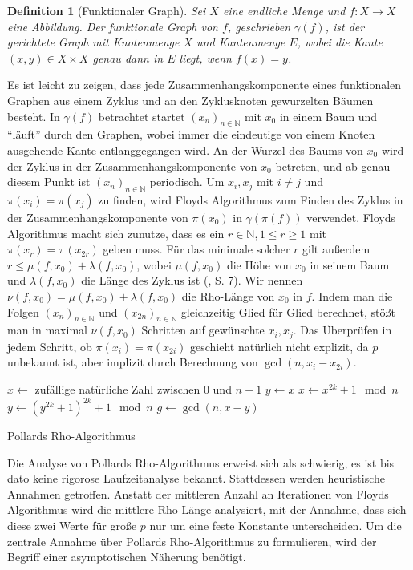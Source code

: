 \documentclass[a4paper, 10pt, ngerman]{article}
\newcommand{\N}{\mathbb{N}}
\newtheorem{definition}{Definition}
\begin{document}
\begin{definition}[Funktionaler Graph]
    Sei $X$ eine endliche Menge und $f: X \to X$ eine Abbildung. Der funktionale Graph von $f$, geschrieben $\gamma(f)$, ist der gerichtete Graph mit Knotenmenge $X$ und Kantenmenge $E$, wobei die Kante $(x, y) \in X \times X$ genau dann in $E$ liegt, wenn $f(x) = y$.
\end{definition}

\noindent Es ist leicht zu zeigen, dass jede Zusammenhangskomponente eines funktionalen Graphen aus einem Zyklus und an den Zyklusknoten gewurzelten Bäumen besteht. In $\gamma(f)$ betrachtet startet $(x_n)_{n \in \N}$ mit $x_0$ in einem Baum und "`läuft"' durch den Graphen, wobei immer die eindeutige von einem Knoten ausgehende Kante entlanggegangen wird. An der Wurzel des Baums von $x_0$ wird der Zyklus in der Zusammenhangskomponente von $x_0$ betreten, und ab genau diesem Punkt ist $(x_n)_{n \in \N}$ periodisch. Um $x_i, x_j$ mit $i \ne j$ und $\pi(x_i) = \pi(x_j)$ zu finden, wird Floyds Algorithmus zum Finden des Zyklus in der Zusammenhangskomponente von $\pi(x_0)$ in $\gamma(\pi(f))$ verwendet. Floyds Algorithmus macht sich zunutze, dass es ein $r \in \N, 1 \le r \ge 1$ mit $\pi(x_r) = \pi(x_{2r})$ geben muss. Für das minimale solcher $r$ gilt außerdem $r \le \mu(f, x_0) + \lambda(f, x_0)$, wobei $\mu(f, x_0)$ die Höhe von $x_0$ in seinem Baum und $\lambda(f, x_0)$ die Länge des Zyklus ist (\cite{knu98}, S. 7). Wir nennen $\nu(f, x_0) = \mu(f, x_0) + \lambda(f, x_0)$ die Rho-Länge von $x_0$ in $f$. Indem man die Folgen $(x_n)_{n \in \N}$ und $(x_{2n})_{n \in \N}$ gleichzeitig Glied für Glied berechnet, stößt man in maximal $\nu(f, x_0)$ Schritten auf gewünschte $x_i, x_j$. Das Überprüfen in jedem Schritt, ob $\pi(x_i) = \pi(x_{2i})$ geschieht natürlich nicht explizit, da $p$ unbekannt ist, aber implizit durch Berechnung von $\gcd(n, x_i - x_{2i})$.

\begin{algorithm*}
    $x \gets $ zufällige natürliche Zahl zwischen $0$ und $n - 1$ \;
    $y \gets x$ \;
    {
        $x \gets x^{2k} + 1 \mod n$ \;
        $y \gets (y^{2k} + 1)^{2k} + 1 \mod n$ \;
        $g \gets \gcd(n, x - y)$ \;
        {
             \;
        }
    }

    \caption{Pollards Rho-Algorithmus}
\end{algorithm*}

\noindent Die Analyse von Pollards Rho-Algorithmus erweist sich als schwierig, es ist bis dato keine rigorose Laufzeitanalyse bekannt. Stattdessen werden heuristische Annahmen getroffen. Anstatt der mittleren Anzahl an Iterationen von Floyds Algorithmus wird die mittlere Rho-Länge analysiert, mit der Annahme, dass sich diese zwei Werte für große $p$ nur um eine feste Konstante unterscheiden. Um die zentrale Annahme über Pollards Rho-Algorithmus zu formulieren, wird der Begriff einer asymptotischen Näherung benötigt.
\end{document}
